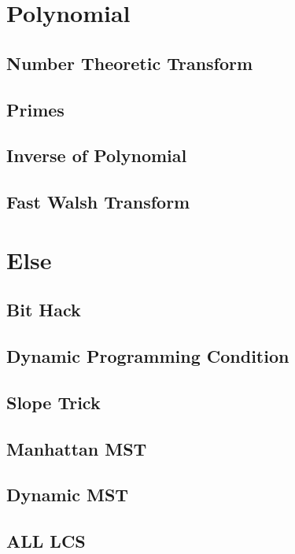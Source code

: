 \section{Polynomial}
\subsection{Number Theoretic Transform}

\subsection{Primes}

\subsection{Inverse of Polynomial}

\subsection{Fast Walsh Transform}


\section{Else}
\subsection{Bit Hack}

\subsection{Dynamic Programming Condition}

\subsection{Slope Trick}

\subsection{Manhattan MST}

\subsection{Dynamic MST}

\subsection{ALL LCS}

